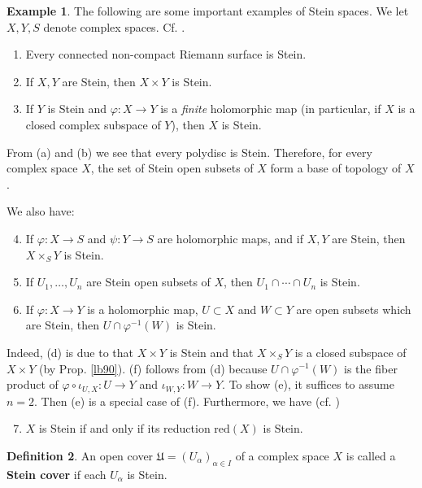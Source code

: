 \documentclass[12pt,b5paper,notitlepage]{report}
\theoremstyle{definition}
\newtheorem{df}{Definition}[section]
\newtheorem{eg}[df]{Example}
\theoremstyle{plain}
\newcommand{\fk}{\mathfrak}
\newcommand{\red}{\mathrm{red}}
\numberwithin{equation}{section}
\begin{document}
\begin{eg}\label{lb329}
The following are some important examples of Stein spaces. We let $X,Y,S$ denote complex spaces. Cf. \cite[Sec. V.1]{GR-a}.
\begin{enumerate}[label=(\alph*)]
\item Every connected non-compact Riemann surface is Stein.
\item If $X,Y$ are Stein, then $X\times Y$ is Stein.
\item If $Y$ is Stein and $\varphi:X\rightarrow Y$ is a \emph{finite} holomorphic map (in particular, if $X$ is a closed complex subspace of $Y$), then $X$ is Stein.
\end{enumerate}
From (a) and (b) we see that every polydisc is Stein. Therefore, for every complex space $X$, the set of Stein open subsets of $X$ form a base of topology of $X$. 

We also have:
\begin{enumerate}[label=(\alph*)]\setcounter{enumi}{3}
\item If $\varphi:X\rightarrow S$ and $\psi:Y\rightarrow S$ are holomorphic maps, and if $X,Y$ are Stein, then $X\times_SY$ is Stein. 
\item If $U_1,\dots,U_n$ are Stein open subsets of $X$, then $U_1\cap\cdots\cap U_n$ is Stein.
\item If $\varphi:X\rightarrow Y$ is a holomorphic map, $U\subset X$ and $W\subset Y$ are open subsets which are Stein, then $U\cap\varphi^{-1}(W)$ is Stein. 
\end{enumerate}
Indeed, (d) is due to that $X\times Y$ is Stein and that $X\times_SY$ is a closed subspace of $X\times Y$ (by Prop. \ref{lb90}). (f) follows from (d) because $U\cap\varphi^{-1}(W)$ is the fiber product of $\varphi\circ\iota_{U,X}:U\rightarrow Y$ and $\iota_{W,Y}:W\rightarrow Y$. To show (e), it suffices to assume $n=2$. Then (e) is a special case of (f). Furthermore, we have (cf. \cite[Sec. V.4.3]{GR-a})
\begin{enumerate}[label=(\alph*)]\setcounter{enumi}{6}
\item $X$ is Stein if and only if its reduction $\red(X)$ is Stein.
\end{enumerate}
\hfill\qedsymbol
\end{eg}




\begin{df}
An open cover $\fk U=(U_\alpha)_{\alpha\in I}$ of a complex space $X$ is called a \textbf{Stein cover} if each $U_\alpha$ is Stein.  
\end{df}
\end{document}
